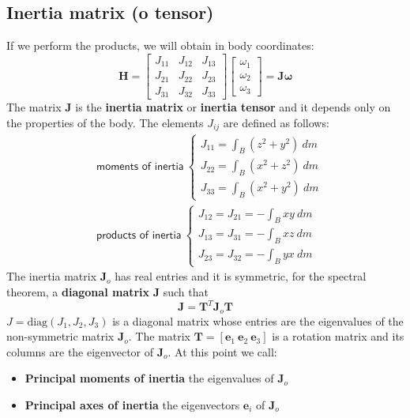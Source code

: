 \subsection{Inertia matrix (o tensor)}
If we perform the products, we will obtain in body coordinates:
\begin{equation}
    \mathbf{H}=\begin{bmatrix}
        J_{11}&J_{12}&J_{13}\\
        J_{21}&J_{22}&J_{23}\\
        J_{31}&J_{32}&J_{33}
    \end{bmatrix}\begin{bmatrix}
        \omega_1\\\omega_2\\\omega_3
    \end{bmatrix}=\boldsymbol{J\omega}
\end{equation}
The matrix $\mathbf{J}$ is the \textbf{inertia matrix} or \textbf{inertia tensor} and it depends only on the properties of the body. The elements $J_{ij}$ are defined as follows:
\begin{align*}
    &\textsf{moments of inertia} \ \begin{cases}
        J_{11}=\int_B (z^2+y^2) \ dm\\
        J_{22}=\int_B (x^2+z^2) \ dm\\
        J_{33}=\int_B (x^2+y^2) \ dm
    \end{cases}\\
    &\textsf{products of inertia} \ \begin{cases}
        J_{12}=J_{21}=-\int_B xy \ dm\\
        J_{13}=J_{31}=-\int_B xz \ dm\\
        J_{23}=J_{32}=-\int_B yx \ dm
    \end{cases}
\end{align*}
The inertia matrix $\mathbf{J}_o$ has real entries and it is symmetric, for the spectral theorem, a \textbf{diagonal matrix} $\mathbf{J}$ such that 
$$\mathbf{J} = \mathbf{T}^T\mathbf{J}_o\mathbf{T}$$
$J=\text{diag}(J_1, J_2, J_3)$ is a diagonal matrix whose entries are the eigenvalues of the non-symmetric matrix $\mathbf{J}_o$.
The matrix $\mathbf{T}=[\mathbf{e}_1 \ \mathbf{e}_2 \ \mathbf{e}_3]$ is a rotation matrix and its columns are the eigenvector of $\mathbf{J}_o$.
At this point we call:
\begin{itemize}
    \item \textbf{Principal moments of inertia} the eigenvalues of $\mathbf{J}_o$
    \item \textbf{Principal axes of inertia} the eigenvectors $\mathbf{e}_i$ of $\mathbf{J}_o$
\end{itemize}

